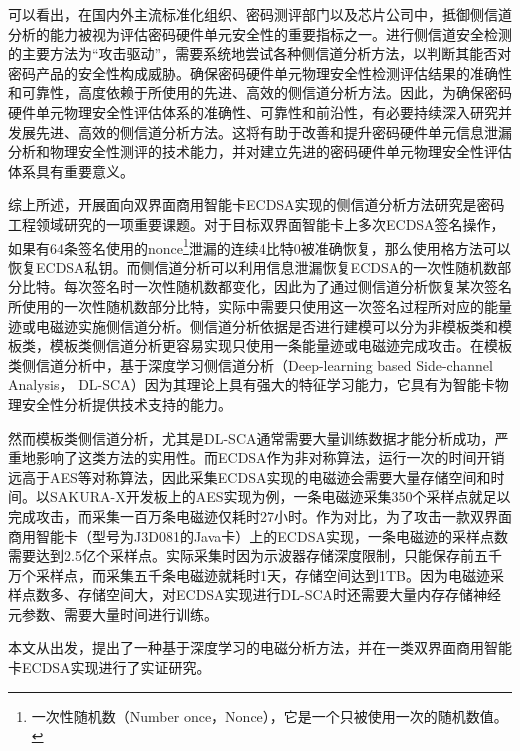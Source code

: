 {	可以看出，在国内外主流标准化组织、密码测评部门以及芯片公司中，抵御侧信道分析的能力被视为评估密码硬件单元安全性的重要指标之一。进行侧信道安全检测的主要方法为“攻击驱动”，需要系统地尝试各种侧信道分析方法，以判断其能否对密码产品的安全性构成威胁\citep{ISO/IEC15408, GB/T18336}。确保密码硬件单元物理安全性检测评估结果的准确性和可靠性，高度依赖于所使用的先进、高效的侧信道分析方法。因此，为确保密码硬件单元物理安全性评估体系的准确性、可靠性和前沿性，有必要持续深入研究并发展先进、高效的侧信道分析方法。这将有助于改善和提升密码硬件单元信息泄漏分析和物理安全性测评的技术能力，并对建立先进的密码硬件单元物理安全性评估体系具有重要意义。
	
	综上所述，开展面向双界面商用智能卡ECDSA实现的侧信道分析方法研究是密码工程领域研究的一项重要课题。对于目标双界面智能卡上多次ECDSA签名操作，如果有64条签名使用的nonce\footnote{一次性随机数（Number once，Nonce），它是一个只被使用一次的随机数值。}泄漏的连续4比特0被准确恢复，那么使用格方法可以恢复ECDSA私钥\citep{Hlavac06}。而侧信道分析可以利用信息泄漏恢复ECDSA的一次性随机数部分比特。每次签名时一次性随机数都变化，因此为了通过侧信道分析恢复某次签名所使用的一次性随机数部分比特，实际中需要只使用这一次签名过程所对应的能量迹或电磁迹实施侧信道分析。侧信道分析依据是否进行建模可以分为非模板类和模板类，模板类侧信道分析更容易实现只使用一条能量迹或电磁迹完成攻击。在模板类侧信道分析中，基于深度学习侧信道分析（Deep-learning based Side-channel Analysis， DL-SCA）因为其理论上具有强大的特征学习能力，它具有为智能卡物理安全性分析提供技术支持的能力。
	
	然而模板类侧信道分析，尤其是DL-SCA通常需要大量训练数据才能分析成功，严重地影响了这类方法的实用性。而ECDSA作为非对称算法，运行一次的时间开销远高于AES等对称算法，因此采集ECDSA实现的电磁迹会需要大量存储空间和时间。以SAKURA-X开发板上的AES实现为例，一条电磁迹采集350个采样点就足以完成攻击，而采集一百万条电磁迹仅耗时27小时。作为对比，为了攻击一款双界面商用智能卡（型号为J3D081的Java卡）上的ECDSA实现，一条电磁迹的采样点数需要达到2.5亿个采样点。实际采集时因为示波器存储深度限制，只能保存前五千万个采样点，而采集五千条电磁迹就耗时1天，存储空间达到1TB。因为电磁迹采样点数多、存储空间大，对ECDSA实现进行DL-SCA时还需要大量内存存储神经元参数、需要大量时间进行训练。
	
	本文从\jiaodu 出发，提出了一种基于深度学习的电磁分析方法，并在一类双界面商用智能卡ECDSA实现进行了实证研究。
{	
	
}}
